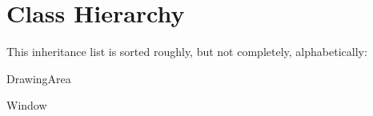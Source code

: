 \section{Class Hierarchy}
This inheritance list is sorted roughly, but not completely, alphabetically\+:\begin{DoxyCompactList}
\item Drawing\+Area\begin{DoxyCompactList}
\item {}
\item {}
\end{DoxyCompactList}
\item {}
\item {}
\item Window\begin{DoxyCompactList}
\item {}
\item {}
\item {}
\end{DoxyCompactList}
\end{DoxyCompactList}
